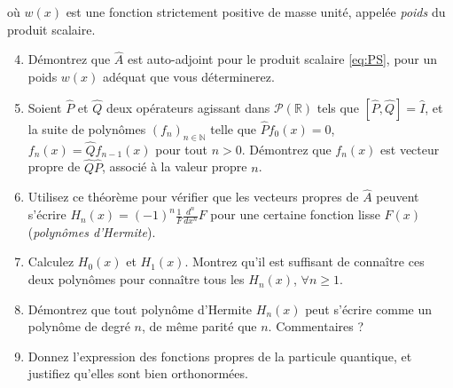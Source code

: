 où $w(x)$ est une fonction strictement positive de masse unité, appelée \textit{poids} du produit scalaire. 
\begin{enumerate}
\setcounter{enumi}{3}
\item Démontrez que $\hat A$ est auto-adjoint pour le produit scalaire \eqref{eq:PS}, pour un poids $w(x)$ adéquat que vous déterminerez. 
\item Soient $\hat P$ et $\hat Q$ deux opérateurs agissant dans $\mathcal P(\mathbb R)$ tels que $[\hat P,\hat Q]=\hat I$, et la suite de polynômes $(f_n)_{n\in\mathbb N}$ telle que $\hat Pf_0(x) = 0$, $f_n(x) = \hat Qf_{n-1}(x)$ pour tout $n>0$. Démontrez que $f_n(x)$ est vecteur propre de $\hat Q\hat P$, associé à la valeur propre $n$.
\item Utilisez ce théorème pour vérifier que les vecteurs propres de $\hat A$ peuvent s'écrire $H_n(x) = (-1)^n \frac{1}{F}\frac{d^n}{dx^n}F$ pour une certaine fonction lisse $F(x)$ (\textit{polynômes d'Hermite}).
\item Calculez $H_0(x)$ et $H_1(x)$. Montrez qu'il est suffisant de connaître ces deux polynômes pour connaître tous les $H_n(x)$, $\forall n\geq 1$.
\item Démontrez que tout polynôme d'Hermite $H_n(x)$ peut s'écrire comme un polynôme de degré $n$, de même parité que $n$. Commentaires ?
\item Donnez l'expression des fonctions propres de la particule quantique, et justifiez qu'elles sont bien orthonormées.
\end{enumerate}


\newpage
